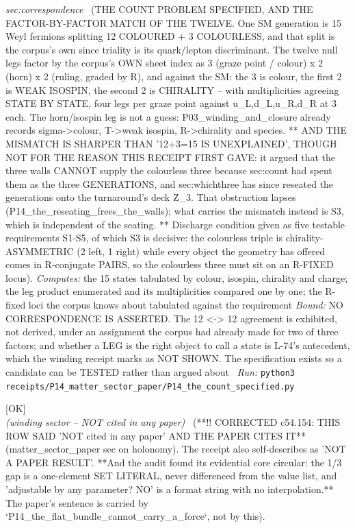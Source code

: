 \begin{description}
\textit{sec:correspondence} \ (THE COUNT PROBLEM SPECIFIED, AND THE FACTOR-BY-FACTOR MATCH OF THE TWELVE. One SM generation is 15 Weyl fermions splitting 12 COLOURED + 3 COLOURLESS, and that split is the corpus's own since triality is its quark/lepton discriminant. The twelve null legs factor by the corpus's OWN sheet index as 3 (graze point / colour) x 2 (horn) x 2 (ruling, graded by R), and against the SM: the 3 is colour, the first 2 is WEAK ISOSPIN, the second 2 is CHIRALITY -- with multiplicities agreeing STATE BY STATE, four legs per graze point against u\_L,d\_L,u\_R,d\_R at 3 each. The horn/isospin leg is not a guess: P03\_winding\_and\_closure already records sigma->colour, T->weak isospin, R->chirality and species. ** AND THE MISMATCH IS SHARPER THAN '12+3=15 IS UNEXPLAINED', THOUGH NOT FOR THE REASON THIS RECEIPT FIRST GAVE: it argued that the three walls CANNOT supply the colourless three because sec:count had spent them as the three GENERATIONS, and sec:whichthree has since reseated the generations onto the turnaround's deck Z\_3. That obstruction lapses (P14\_the\_reseating\_frees\_the\_walls); what carries the mismatch instead is S3, which is independent of the seating. ** Discharge condition given as five testable requirements S1-S5, of which S3 is decisive: the colourless triple is chirality-ASYMMETRIC (2 left, 1 right) while every object the geometry has offered comes in R-conjugate PAIRS, so the colourless three must sit on an R-FIXED locus). 
\emph{Computes:} the 15 states tabulated by colour, isospin, chirality and charge; the leg product enumerated and its multiplicities compared one by one; the R-fixed loci the corpus knows about tabulated against the requirement
 \emph{Bound:} NO CORRESPONDENCE IS ASSERTED. The 12 <-> 12 agreement is exhibited, not derived, under an assignment the corpus had already made for two of three factors; and whether a LEG is the right object to call a state is L-74's antecedent, which the winding receipt marks as NOT SHOWN. The specification exists so a candidate can be TESTED rather than argued about
\ \emph{Run:} \texttt{python3 receipts/P14\_matter\_sector\_paper/P14\_the\_count\_specified.py}
\item[\rcptlabel{P14_quantisation_not_strength}{P14R23}\textbf{P14R23}\quad\texttt{P14\_quantisation\_not\_strength}]\hfill\textsf{[OK]}\\
\textit{(winding sector -- NOT cited in any paper)} \ (**!! CORRECTED c54.154: THIS ROW SAID 'NOT cited in any paper' AND THE PAPER CITES IT** (matter\_sector\_paper sec on holonomy). The receipt also self-describes as 'NOT A PAPER RESULT'. **And the audit found its evidential core circular: the 1/3 gap is a one-element SET LITERAL, never differenced from the value list, and 'adjustable by any parameter? NO' is a format string with no interpolation.** The paper's sentence is carried by `P14\_the\_flat\_bundle\_cannot\_carry\_a\_force`, not by this). 

\end{description}
